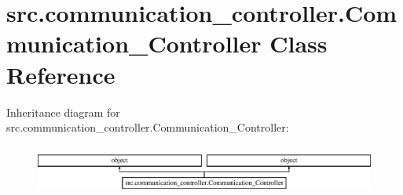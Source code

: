 \hypertarget{classsrc_1_1communication__controller_1_1_communication___controller}{\section{src.\-communication\-\_\-controller.\-Communication\-\_\-\-Controller Class Reference}
\label{classsrc_1_1communication__controller_1_1_communication___controller}
}
Inheritance diagram for src.\-communication\-\_\-controller.\-Communication\-\_\-\-Controller\-:\begin{figure}[H]
\begin{center}
\leavevmode
\includegraphics[height=1.656805cm]{classsrc_1_1communication__controller_1_1_communication___controller}
\end{center}
\end{figure}

